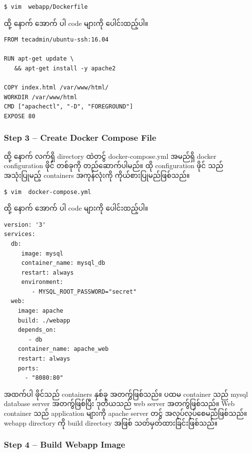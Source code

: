 \documentclass[]{article}
\begin{document}
\begin{verbatim}
$ vim  webapp/Dockerfile
\end{verbatim}

ထို့ နောက် အောက် ပါ code များကို ပေါင်းထည့်ပါ။

\begin{verbatim}
FROM tecadmin/ubuntu-ssh:16.04

RUN apt-get update \
   && apt-get install -y apache2

COPY index.html /var/www/html/
WORKDIR /var/www/html
CMD ["apachectl", "-D", "FOREGROUND"]
EXPOSE 80
\end{verbatim}

\hypertarget{step-3-create-docker-compose-file}{%
\subsubsection{Step 3 -- Create Docker Compose
File}\label{step-3-create-docker-compose-file}}

ထို့ နောက် လက်ရှိ directory ထဲတင်ွ docker-compose.yml အမည်ရှိ docker
configuration ဖိုင် တစ်ခုကို တည်ဆောက်ပါမည်။ ထို configuration ဖိုင် သည်
အသုံးပြုမည့် containers အကုန်လုံးကို ကိုယ်စားပြုမည်ဖြစ်သည်။

\begin{verbatim}
$ vim  docker-compose.yml
\end{verbatim}

ထို့ နောက် အောက် ပါ code များကို ပေါင်းထည့်ပါ။

\begin{verbatim}
version: '3'
services:
  db:
     image: mysql
     container_name: mysql_db
     restart: always
     environment:
        - MYSQL_ROOT_PASSWORD="secret"
  web:
    image: apache
    build: ./webapp
    depends_on:
       - db
    container_name: apache_web
    restart: always
    ports:
      - "8080:80"
\end{verbatim}

အထက်ပါ ဖိုင်သည် containers နှစ်ခု အတက်ွဖြစ်သည်။ ပထမ container သည် mysql
database server အတက်ွဖြစ်ပြီး ဒုတိယသည် web server အတက်ွဖြစ်သည်။ Web
container သည် application များကို apache server တင်ွ
အလုပ်လုပ်စေမည်ဖြစ်သည်။ webapp directory ကို build directory အဖြစ်
သတ်မှတ်ထားခြင်းဖြစ်သည်။

\hypertarget{step-4-build-webapp-image}{%
\subsubsection{Step 4 -- Build Webapp
Image}\label{step-4-build-webapp-image}}
\end{document}
